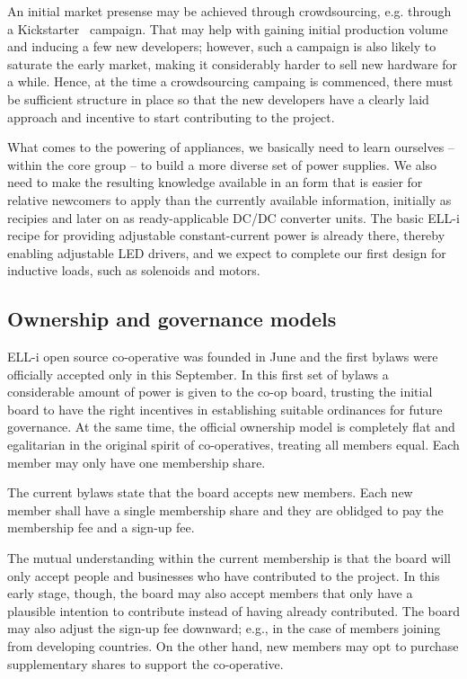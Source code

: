 \documentclass[draft,a4paper]{siamltex}
\begin{document}
An initial market presense may be achieved through crowdsourcing,
e.g. through a Kickstarter~\cite{Kickstarter} campaign.  That may help
with gaining initial production volume and inducing a few new
developers; however, such a campaign is also likely to saturate the
early market, making it considerably harder to sell new hardware for a
while.  Hence, at the time a crowdsourcing campaing is commenced,
there must be sufficient structure in place so that the new developers
have a clearly laid approach and incentive to start contributing to
the project.

What comes to the powering of appliances, we basically need to learn
ourselves -- within the core group -- to build a more diverse set of
power supplies.  We also need to make the resulting knowledge
available in an form that is easier for relative newcomers to apply
than the currently available information, initially as recipies and
later on as ready-applicable DC/DC converter units.  The basic ELL-i
recipe for providing adjustable constant-current power is already
there, thereby enabling adjustable LED drivers, and we expect to
complete our first design for inductive loads, such as solenoids and
motors.

\subsection{Ownership and governance models}
\label{ssec:ownership}

ELL-i open source co-operative was founded in June and the first
bylaws were officially accepted only in this September.  In this first
set of bylaws a considerable amount of power is given to the co-op
board, trusting the initial board to have the right incentives in
establishing suitable ordinances for future governance.  At the same
time, the official ownership model is completely flat and egalitarian
in the original spirit of co-operatives, treating all members equal.
Each member may only have one membership share.

The current bylaws state that the board accepts new members.  Each new
member shall have a single membership share and they are oblidged to
pay the membership fee and a sign-up fee.

The mutual understanding within the current membership is that the
board will only accept people and businesses who have contributed to
the project.  In this early stage, though, the board may also accept
members that only have a plausible intention to contribute instead of
having already contributed.  The board may also adjust the sign-up fee
downward; e.g., in the case of members joining from developing
countries.   On the other hand, new members may opt to purchase
supplementary shares to support the co-operative.
\end{document}
